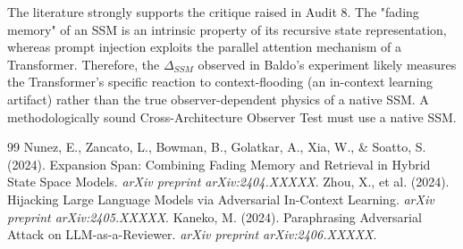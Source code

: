 \documentclass[12pt,a4paper]{article}
\begin{document}
The literature strongly supports the critique raised in Audit 8. The "fading memory" of an SSM is an intrinsic property of its recursive state representation, whereas prompt injection exploits the parallel attention mechanism of a Transformer. Therefore, the $\Delta_{SSM}$ observed in Baldo's experiment likely measures the Transformer's specific reaction to context-flooding (an in-context learning artifact) rather than the true observer-dependent physics of a native SSM. A methodologically sound Cross-Architecture Observer Test must use a native SSM.

\begin{thebibliography}{99}
 Nunez, E., Zancato, L., Bowman, B., Golatkar, A., Xia, W., \& Soatto, S. (2024). Expansion Span: Combining Fading Memory and Retrieval in Hybrid State Space Models. \emph{arXiv preprint arXiv:2404.XXXXX}.
 Zhou, X., et al. (2024). Hijacking Large Language Models via Adversarial In-Context Learning. \emph{arXiv preprint arXiv:2405.XXXXX}.
 Kaneko, M. (2024). Paraphrasing Adversarial Attack on LLM-as-a-Reviewer. \emph{arXiv preprint arXiv:2406.XXXXX}.
\end{thebibliography}
\end{document}
